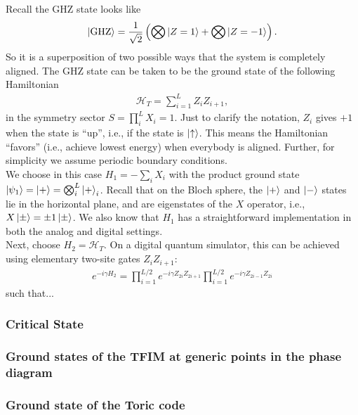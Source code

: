 \documentclass{book}
\theoremstyle{definition}
\newcommand{\had}{\mathcal{H}}
\newcommand{\f}[2]{\frac{#1}{#2}}
\newcommand{\lp}{\left(}
\newcommand{\rp}{\right)}
\begin{document}
Recall the GHZ state looks like
\begin{align}
\ket{\text{GHZ}} = \f{1}{\sqrt{2}}\lp \bigotimes \ket{Z=1} + \bigotimes \ket{Z = -1} \rp.
\end{align} 
So it is a superposition of two possible ways that the system is completely aligned. The GHZ state can be taken to be the ground state of the following Hamiltonian
\begin{align}
\had_T = \sum^L_{i=1}Z_i Z_{i+1},
\end{align}
in the symmetry sector $S = \prod^L_{i}X_i =1$. Just to clarify the notation, $Z_i$ gives $+1$ when the state is ``up'', i.e., if the state is $\ket{\uparrow}$. This means the Hamiltonian ``favors'' (i.e., achieve lowest energy) when everybody is aligned. Further, for simplicity we assume periodic boundary conditions.\\

We choose in this case $H_1 = -\sum_i X_i$ with the product ground state $\ket{\psi_1} = \ket{+} = \bigotimes^L_{i}\ket{+}_i$. Recall that on the Bloch sphere, the $\ket{+}$ and $\ket{-}$ states lie in the horizontal plane, and are eigenstates of the $X$ operator, i.e., $X\ket{\pm} = \pm 1 \ket{\pm}$. We also know that $H_1$ has a straightforward implementation in both the analog and digital settings. \\

Next, choose $H_2 = \had_T$. On a digital quantum simulator, this can be achieved using elementary two-site gates $Z_i Z_{i+1}$: 
\begin{align}
e^{-i\gamma H_2} = \prod^{L/2}_{i=1} e^{-i\gamma Z_{2i}Z_{2i+1}}   \prod^{L/2}_{i=1} e^{-i\gamma Z_{2i-1}Z_{2i}}
\end{align}
such that...



 

\subsubsection{Critical State}

\subsubsection{Ground states of the TFIM at generic points in the phase diagram}

\subsubsection{Ground state of the Toric code}
\end{document}
